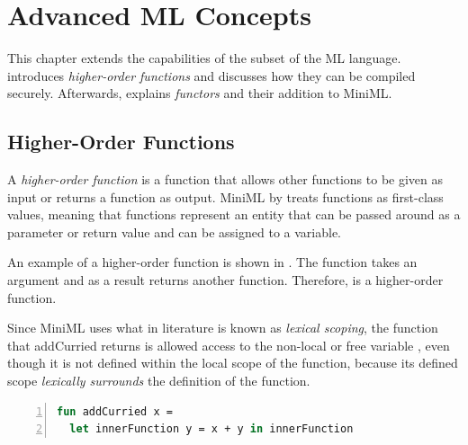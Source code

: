\chapter{Advanced ML Concepts}
\label{chap:AdvancedConcepts}

This chapter extends the capabilities of the subset of the ML language.  introduces \emph{higher-order functions} and discusses how they can be compiled securely. Afterwards,  explains \emph{functors} and their addition to MiniML. %

\section{Higher-Order Functions}
\label{sec:HOF}

A \emph{higher-order function} is a function that allows other functions to be given as input or returns a function as output. \mbox{MiniML} by treats functions as first-class values, meaning that functions represent an entity that can be passed around as a parameter or return value and can be assigned to a variable.

\smallskip
An example of a higher-order function is shown in . 
The function  takes an argument  and as a result returns another function.
Therefore,  is a higher-order function.

Since \mbox{MiniML} uses what in literature is known as \emph{lexical scoping}, the function that addCurried returns is allowed access to the non-local or free variable , even though it is not defined within the local scope of the function, because its defined scope \emph{lexically surrounds} the definition of the function.


\begin{lstlisting}[frame=single, language=ML,caption={[Lexical Scoping]The use of lexical scoping calls for closures.}, label=code:LexicalScopingExample,numbers=left]
fun addCurried x = 
  let innerFunction y = x + y in innerFunction
\end{lstlisting}

